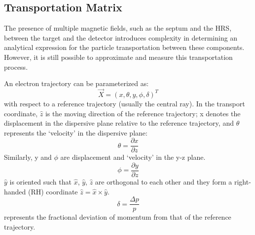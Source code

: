 \subsection{Transportation Matrix}
The presence of multiple magnetic fields, such as the septum and the HRS, between the target and the detector introduces complexity in determining an analytical expression for the particle transportation between these components. However, it is still possible to approximate and measure this transportation process.

An electron trajectory can be parameterized as: 
\begin{equation}
    \vec{X} = (x, \theta, y, \phi, \delta)^T
\end{equation}
with respect to a reference trajectory (usually the central ray). In the transport coordinate, 
$\hat{z}$ is the moving direction of the reference trajectory;
x denotes the displacement in the dispersive plane relative to the reference 
trajectory, and $\theta$ represents the `velocity' in the dispersive plane:
\begin{equation}
    \theta = \frac{\partial x}{\partial z}
\end{equation}
Similarly, y and $\phi$ are displacement and `velocity' in the y-z plane. 
\begin{equation}
    \phi = \frac{\partial y}{\partial z}
\end{equation}
$\hat{y}$ is oriented such that $\hat{x}$, $\hat{y}$, $\hat{z}$ are orthogonal 
to each other and they form a right-handed (RH) coordinate $\hat{z} = \hat{x} \times \hat{y}$.
\begin{equation}
    \delta = \frac{\Delta p}{p}
\end{equation}
represents the fractional deviation of momentum from that of the reference trajectory. 

